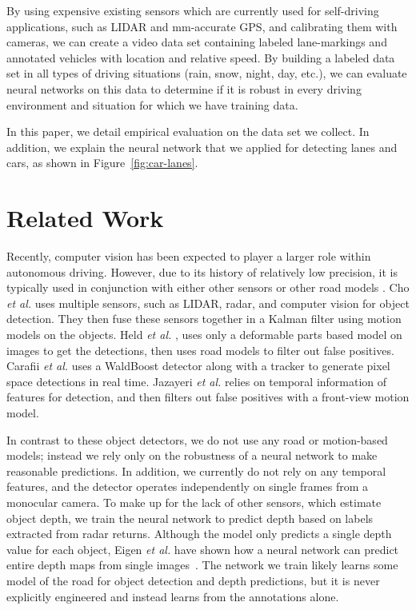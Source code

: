 \documentclass[journal]{IEEEtran}
\begin{document}
By using expensive existing sensors which are currently used for self-driving applications, such as LIDAR and mm-accurate GPS, and calibrating them with cameras, we can create a video data set containing labeled lane-markings and annotated vehicles with location and relative speed. By building a labeled data set in all types of driving situations (rain, snow, night, day, etc.), we can evaluate neural networks on this data to determine if it is robust in every driving environment and situation for which we have training data.

In this paper, we detail empirical evaluation on the data set we collect. In addition, we explain the neural network that we applied for detecting lanes and cars, as shown in Figure~\ref{fig:car-lanes}.

\section{Related Work}
Recently, computer vision has been expected to player a larger role within autonomous driving. However, due to its history of relatively low precision, it is typically used in conjunction with either other sensors or other road models \cite{cho-2014,held-2012,carafii-2012,jazayeri-2011}. Cho \textit{et al.} \cite{cho-2014} uses multiple sensors, such as LIDAR, radar, and computer vision for object detection. They then fuse these sensors together in a Kalman filter using motion models on the objects. Held \textit{et al.} \cite{held-2012}, uses only a deformable parts based model on images to get the detections, then uses road models to filter out false positives. Carafii \textit{et al.} \cite{carafii-2012} uses a WaldBoost detector along with a tracker to generate pixel space detections in real time. Jazayeri \textit{et al.} \cite{jazayeri-2011} relies on temporal information of features for detection, and then filters out false positives with a front-view motion model.

In contrast to these object detectors, we do not use any road or motion-based models; instead we rely only on the robustness of a neural network to make reasonable predictions. In addition, we currently do not rely on any temporal features, and the detector operates independently on single frames from a monocular camera. To make up for the lack of other sensors, which estimate object depth, we train the neural network to predict depth based on labels extracted from radar returns. Although the model only predicts a single depth value for each object, Eigen \textit{et al.} have shown how a neural network can predict entire depth maps from single images~\cite{eigen-2014}. The network we train likely learns some model of the road for object detection and depth predictions, but it is never explicitly engineered and instead learns from the annotations alone.
\end{document}
